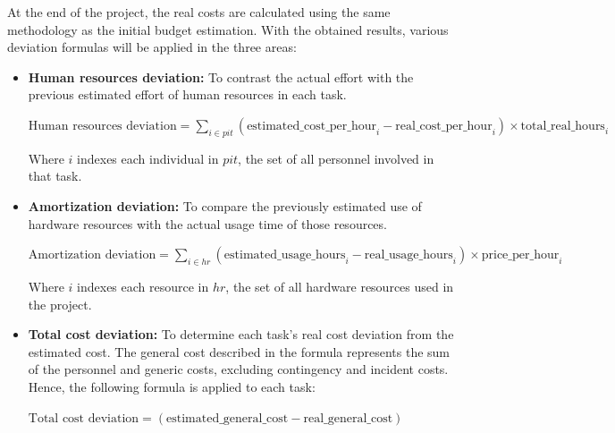\vspace{-10pt}


At the end of the project, the real costs are calculated using the same methodology as the initial budget estimation. With the obtained results, various deviation formulas will be applied in the three areas:


\begin{itemize} [leftmargin=0.75cm, noitemsep]
    \item \textbf{Human resources deviation:} To contrast the actual effort with the previous estimated effort of human resources in each task.
    
    \vspace{5pt}
    {\footnotesize
    \centerline{$\displaystyle
    \text{Human resources deviation} =
    \sum_{i \in pit} 
    \left(
    \text{estimated\_cost\_per\_hour}_i - \text{real\_cost\_per\_hour}_i
    \right) 
    \times
    \text{total\_real\_hours}_i
    $}
    }

    {\footnotesize
        Where $i$ indexes each individual in $pit$, the set of all personnel involved in that task.
    }
    
    \item \textbf{Amortization deviation:} To compare the previously estimated use of hardware resources with the actual usage time of those resources.
    
    \vspace{5pt}
    {\footnotesize
    \centerline{$\displaystyle
    \text{Amortization deviation} =
    \sum_{i \in hr} 
    \left(
    \text{estimated\_usage\_hours}_i - \text{real\_usage\_hours}_i
    \right) 
    \times
    \text{price\_per\_hour}_i
    $}
    }
    
    {\footnotesize
        Where $i$ indexes each resource in $hr$, the set of all hardware resources used in the project.
    }

    \item \textbf{Total cost deviation:} To determine each task's real cost deviation from the estimated cost. The general cost described in the formula represents the sum of the personnel and generic costs, excluding contingency and incident costs. Hence, the following formula is applied to each task:

    \vspace{5pt}
    {\small
    \centerline{$\displaystyle
    \text{Total cost deviation} =
    \left(
    \text{estimated\_general\_cost} - \text{real\_general\_cost}
    \right) 
    $}
    }
    
\end{itemize}

